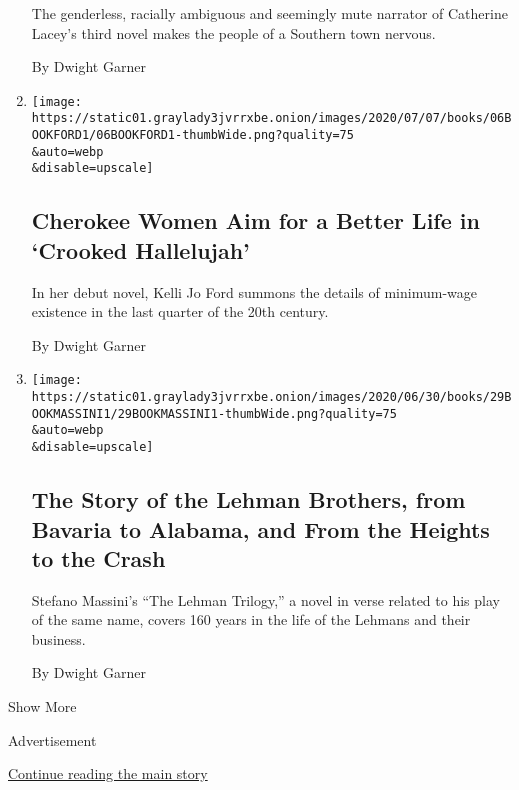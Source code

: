 \begin{enumerate}
  The genderless, racially ambiguous and seemingly mute narrator of
  Catherine Lacey's third novel makes the people of a Southern town
  nervous.

  By Dwight Garner
\item
  \href{/2020/07/06/books/review-crooked-hallelujah-kelli-jo-ford.html}{}

  \texttt{[image: https://static01.graylady3jvrrxbe.onion/images/2020/07/07/books/06BOOKFORD1/06BOOKFORD1-thumbWide.png?quality=75\\\&auto=webp\\\&disable=upscale]}

  \hypertarget{cherokee-women-aim-for-a-better-life-in-crooked-hallelujah}{%
  \subsection{Cherokee Women Aim for a Better Life in `Crooked
  Hallelujah'}\label{cherokee-women-aim-for-a-better-life-in-crooked-hallelujah}}

  In her debut novel, Kelli Jo Ford summons the details of minimum-wage
  existence in the last quarter of the 20th century.

  By Dwight Garner
\item
  \href{/2020/06/29/books/review-lehman-trilogy-stefano-massini.html}{}

  \texttt{[image: https://static01.graylady3jvrrxbe.onion/images/2020/06/30/books/29BOOKMASSINI1/29BOOKMASSINI1-thumbWide.png?quality=75\\\&auto=webp\\\&disable=upscale]}

  \hypertarget{the-story-of-the-lehman-brothers-from-bavaria-to-alabama-and-from-the-heights-to-the-crash}{%
  \subsection{The Story of the Lehman Brothers, from Bavaria to Alabama,
  and From the Heights to the
  Crash}\label{the-story-of-the-lehman-brothers-from-bavaria-to-alabama-and-from-the-heights-to-the-crash}}

  Stefano Massini's ``The Lehman Trilogy,'' a novel in verse related to
  his play of the same name, covers 160 years in the life of the Lehmans
  and their business.

  By Dwight Garner
\end{enumerate}

Show More

Advertisement

\protect\hyperlink{after-mid2}{Continue reading the main story}

